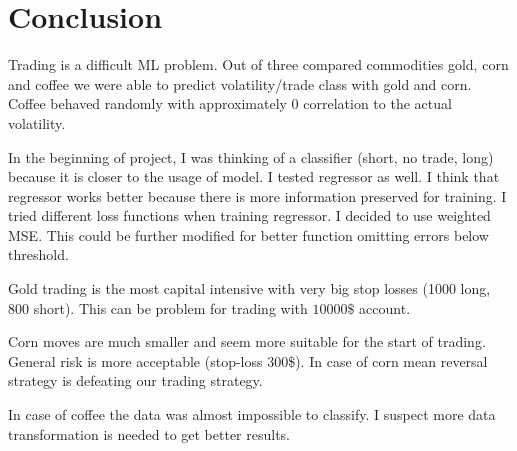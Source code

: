 \documentclass[final,2p]{elsarticle}
\begin{document}
\section{Conclusion}

Trading is a difficult ML problem. Out of three compared commodities gold, corn and coffee we were able to predict volatility/trade class with gold and corn. Coffee behaved randomly with approximately 0 correlation to the actual volatility.

In the beginning of project, I was thinking of a classifier (short, no trade, long) because it is closer to the usage of model. I tested regressor as well. I think that regressor works better because there is more information preserved for training. I tried different loss functions when training regressor. I decided to use weighted MSE. This could be further modified for better function omitting errors below threshold.

Gold trading is the most capital intensive with very big stop losses (1000 long, 800 short). This can be problem for trading with $10 000\$$ account.

Corn moves are much smaller and seem more suitable for the start of trading. General risk is more acceptable (stop-loss 300\$). In case of corn mean reversal strategy is defeating our trading strategy.

In case of coffee the data was almost impossible to classify. I suspect more data transformation is needed to get better results.
\end{document}

